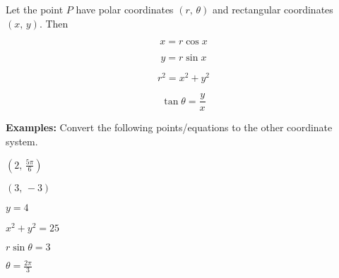 \documentclass[addpoints, 12pt]{exam}
\begin{document}
\begin{tcolorbox}[title= COORDINATE CONVERSION EQUATIONS ,black,sharp corners,colback=white,colbacktitle=white,coltitle=black]

    Let the point $P$ have polar coordinates $(r,\,\theta)$ and rectangular coordinates $(x,\,y)$. Then
    \begin{minipage}[t]{.45\linewidth}
        \[x=r\cos x\]
    \end{minipage}
    \hfill
    \begin{minipage}[t]{.45\linewidth}
        \[y=r\sin x\]
    \end{minipage}
    
    \begin{minipage}[t]{.45\linewidth}
        \[r^2=x^2+y^2\]
    \end{minipage}
    \hfill
    \begin{minipage}[t]{.45\linewidth}
        \[\tan\theta=\frac{y}{x}\]
    \end{minipage}
    
\end{tcolorbox}
\vspace{.1cm}
\noindent\textbf{Examples:} Convert the following points/equations to the other coordinate system.
\begin{questions}
    \begin{minipage}{.45\linewidth}
        \question $\displaystyle\left(2,\,\frac{5\pi}{6}\right)$
    \end{minipage}
    \hfill
    \begin{minipage}{0.45\linewidth}
        \question $\displaystyle (3,\,-3)$
    \end{minipage}
    
    \newpage
    
    \begin{minipage}{0.45\linewidth}
        \question $y=4$
    \end{minipage}
    \hfill
    \begin{minipage}{0.45\linewidth}
        \question $x^2+y^2=25$
    \end{minipage}
    
    
    \begin{minipage}{0.45\linewidth}
        \question $r\sin\theta=3$
    \end{minipage}
    \hfill
    \begin{minipage}{0.45\linewidth}
        \question $\displaystyle\theta=\frac{2\pi}{3}$
    \end{minipage}

    
\end{questions}
\end{document}
